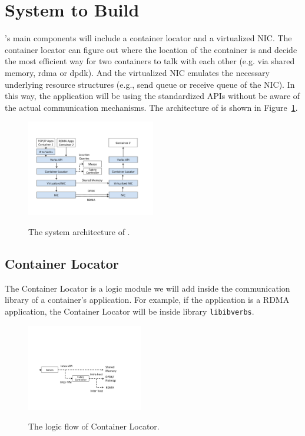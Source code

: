 \section{System to Build} \label{sec:promise}

\sysname's main components will include a container locator and a virtualized NIC.
The container locator can figure out where the location of the container is and
decide the most efficient way for two containers to talk with each other (e.g. 
via shared memory, rdma or dpdk).
And the virtualized NIC emulates the necessary underlying resource structures 
(e.g., send queue or receive queue of the NIC). In this way, the application will
be using the standardized APIs without be aware of the actual communication
mechanisms. The architecture of \sysname is shown in Figure~\ref{fig:system_modules}.

     \begin{figure}[ht]
     \centering 
     \includegraphics[width=0.5\textwidth]{figures/system/system_modules.pdf}      
     \label{fig:system_modules}
     \caption{The system architecture of \sysname.} 
     \end{figure}

\subsection{Container Locator}
The Container Locator is a logic module we will add inside the communication
library of a container's application. For example, if the application is a RDMA application,
the Container Locator will be inside library \texttt{libibverbs}. 

     \begin{figure}[ht]
     \centering 
     \includegraphics[width=0.45\textwidth]{figures/system/system_locator.pdf}      
     \label{fig:system_locator}
     \caption{The logic flow of Container Locator.} 
     \end{figure}

